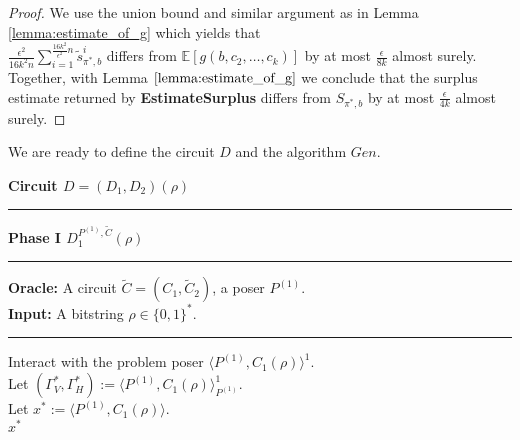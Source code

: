 \begin{proof}
We use the union bound and similar argument as in Lemma \ref{lemma:estimate_of_g}
which yields that \\$\frac{\epsilon^2}{16k^2n} \sum_{i=1}^{\frac{16k^2}{\epsilon^2}n} \widetilde{s}_{\pi^*,b}^i$ differs from
$\mathbb{E}[g(b, c_2, \dots, c_k)]$ by at most $\frac{\epsilon}{8k}$ almost surely. Together, with Lemma $\ref{lemma:estimate_of_g}$ we conclude that the surplus estimate
returned by \textbf{EstimateSurplus} differs from $S_{\pi^*,b}$ by at most $\frac{\epsilon}{4k}$ almost surely.
\end{proof}
We are ready to define the circuit $D$ and the algorithm $Gen$.
%
\begin{codeblock}
  \textbf{Circuit $D = (D_1, D_2) (\rho)$}
  \medskip \hrule \medskip
  \textbf{Phase I $D_1^{P^{(1)}, \widetilde{C}}(\rho)$}
  \medskip \hrule \medskip
  \textbf{Oracle:} A circuit $\widetilde{C} = (C_1, \widetilde{C}_2)$, a poser $P^{(1)}$.\\
  \textbf{Input:} A bitstring $\rho \in \{0,1\}^{*}$.
  \medskip\hrule\medskip

  Interact with the problem poser $\langle P^{(1)}, C_1(\rho) \rangle^1$. \\
  \IndI Let $(\Gamma_V^*, \Gamma_H^*) := \langle P^{(1)}, C_1(\rho) \rangle^1_{P^{(1)}}$. \\
  \IndI Let $x^* := \langle P^{(1)}, C_1(\rho) \rangle$. \\
  \Return $x^*$


\end{codeblock}
